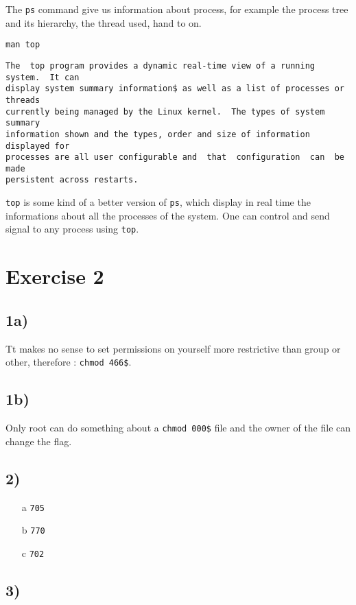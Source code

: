 \documentclass[a4paper,11pt]{report}
\begin{document}
The \verb+ps+ command give us information about process, for example the process
tree and its hierarchy, the thread used, hand to on.

\verb+man top+

\begin{verbatim}
The  top program provides a dynamic real-time view of a running system.  It can
display system summary information$ as well as a list of processes or threads
currently being managed by the Linux kernel.  The types of system summary
information shown and the types, order and size of information displayed for
processes are all user configurable and  that  configuration  can  be  made
persistent across restarts.
\end{verbatim}

\verb+top+ is some kind of a better version of \verb+ps+, which display in real
time the informations about all the processes of the system. One can control and
send signal to any process using \verb+top+.

\section*{Exercise 2}

\subsection*{1a)}

Tt makes no sense to set permissions on yourself more restrictive than group or
other, therefore : \verb+chmod 466$+.

\subsection*{1b)}

Only root can do something about a \verb+chmod 000$+ file and the owner of the
file can change the flag.

\subsection*{2)}

\begin{itemize}
\item[a] \verb+705+
\item[b] \verb+770+
\item[c] \verb+702+
\end{itemize}

\subsection*{3)}
\end{document}
